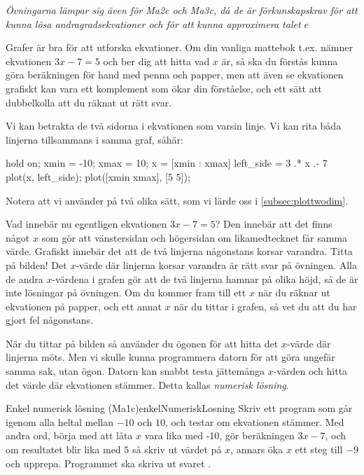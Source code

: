 \emph{Övningarna lämpar sig även för Ma2c och Ma3c, då de är förkunskapskrav för att kunna lösa andragradsekvationer och för att kunna approximera talet $e$}

Grafer är bra för att utforska ekvationer. Om din vanliga mattebok t.ex. nämner ekvationen $3x-7=5$ och ber dig att hitta vad $x$ är, så ska du förstås kunna göra beräkningen för hand med penna och papper, men att även se ekvationen grafiskt kan vara ett komplement som ökar din förståelse, och ett sätt att dubbelkolla att du räknat ut rätt svar.

Vi kan betrakta de två sidorna i ekvationen som varsin linje. Vi kan rita båda linjerna tillsammans i samma graf, såhär:
\vspace{10pt}
\begin{matlab}
hold on;
xmin = -10;
xmax = 10;
x = [xmin : xmax]
left_side = 3 .* x .- 7
plot(x, left_side); %
plot([xmin xmax], [5 5]); %
\end{matlab}

Notera att vi använder  på två olika sätt, som vi lärde oss i \autoref{subsec:plottwodim}.


Vad innebär nu egentligen ekvationen $3x-7=5$? Den innebär att det finns något $x$ som gör att vänstersidan och högersidan om likamedtecknet får samma värde. Grafiskt innebär det att de två linjerna någonstans korsar varandra. Titta på bilden! Det $x$-värde där linjerna korsar varandra är rätt svar på övningen. Alla de andra $x$-värdena i grafen gör att de två linjerna hamnar på olika höjd, så de är inte lösningar på övningen. Om du kommer fram till ett $x$ när du räknar ut ekvationen på papper, och ett annat $x$ när du tittar i grafen, så vet du att du har gjort fel någonstans.


När du tittar på bilden så använder du ögonen för att hitta det $x$-värde där linjerna möts. Men vi skulle kunna programmera datorn för att göra ungefär samma sak, utan ögon. Datorn kan snabbt testa jättemånga $x$-värden och hitta det värde där ekvationen stämmer. Detta kallas \emph{numerisk lösning}.

\begin{matteovning}{Enkel numerisk lösning (Ma1c)}{enkelNumeriskLosning}
Skriv ett program som går igenom alla heltal mellan $-10$ och $10$, och testar om ekvationen stämmer. Med andra ord, börja med att låta $x$ vara lika med -10, gör beräkningen $3x-7$, och om resultatet blir lika med $5$ så skriv ut värdet på $x$, annars öka $x$ ett steg till $-9$ och upprepa. Programmet ska skriva ut svaret .
\end{matteovning}

